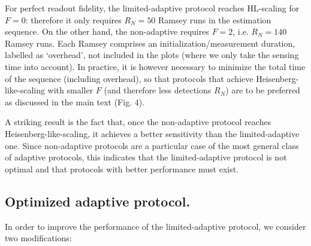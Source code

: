 \documentclass{report}
\begin{document}
For perfect readout fidelity, the limited-adaptive protocol reaches HL-scaling for $F=0$: therefore it only requires $R_N = 50$ Ramsey runs in the estimation sequence. On the other hand, the non-adaptive requires $F=2$, i.e. $R_N = 140$ Ramsey runs. Each Ramsey comprises an initialization/measurement duration, labelled as `overhead', not included in the plots (where we only take the sensing time into account). In practice, it is however necessary to minimize the total time of the sequence (including overhead), so that protocols that achieve Heisenberg-like-scaling with smaller $F$ (and therefore less detections $R_N$) are to be preferred as discussed in the main text (Fig. 4).


A striking result is the fact that, once the non-adaptive protocol reaches Heisenberg-like-scaling, it achieves a better sensitivity than the limited-adaptive one. Since non-adaptive protocols are a particular case of the most general class of adaptive protocols, this indicates that the limited-adaptive protocol is not optimal and that protocols with better performance must exist.

\subsection{Optimized adaptive protocol. }

In order to improve the performance of the limited-adaptive protocol, we consider two modifications:\\
\end{document}
